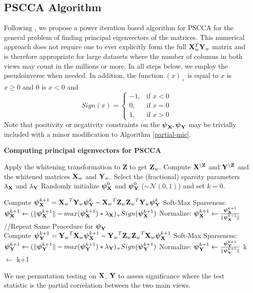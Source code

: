 \documentclass{llncs}
\newcommand{\X}{{\bf X}}
\newcommand{\Y}{{\bf Y}}
\newcommand{\Z}{{\bf Z}}
\newcommand{\bs}{\boldsymbol}
\begin{document}
\subsection{PSCCA Algorithm}
Following \cite{golub}, we propose a power iteration based algorithm
for PSCCA for the general problem of finding principal eigenvectors of
the matrices.  This numerical approach does not require one to ever
explicitly form the full $\X_{w}^T \Y_{w}$ matrix and is therefore
appropriate for large datasets where the number of columns in both views may
count in the millions or more.  In all steps below, we employ the
pseudoinverse when needed.  In addition, the function $(x)_+$ is equal to $x$ is $x \geq 0$ and $0$ is $x <0$ and 
 \begin{equation}
Sign(x)= \begin{cases} -1, & \mbox{if } x<0 \\0, & \mbox{if } x=0 \\1, & \mbox{if } x>0 \end{cases}
\end{equation}
Note that positivity or negativity constraints on the
$\bs\psi_{\X}, \bs\psi_{\Y}$ may be trivially included with a minor
modification to Algorithm \ref{partial-mic}.
\vspace{-0.1in}
\begin{algorithm}[htdp]
\small \caption{\bf Computing principal eigenvectors for PSCCA}
\label{partial-mic}
\begin{algorithmic}[1]
\STATE Apply the whitening transformation to {\Z} to get $\Z_{w}$.
\STATE Compute $\X^{\backslash \Z}$ and $\Y^{\backslash \Z}$ and the whitened matrices $\X_{w}$ and $\Y_{w}$. 
\STATE Select the (fractional) sparsity parameters $\lambda_{\X}$ and $\lambda_{\Y}$
\STATE Randomly initialize $\bs \psi_{\X}^0$ and $\bs \psi_{\Y}^0$ ($\sim \mathcal{N}(0,1)$) and set $k=0$.

\WHILE {$\Delta$ Corr($\bs X_w \bs \psi_{\X}^{k+1}$, $\bs Y_w \bs \psi_{\Y}^{k+1}$) $<$ $\epsilon$}
\STATE Compute  $\bs \psi_{\X}^{k+1}= {\X_w}^T {\Y_w} \bs \psi_{\Y}^{k} -  {\X_w}^T  {\Z_w} {\Z_w}^T {\Y_w} \bs \psi_{\Y}^{k}$
\STATE Soft-Max Sparseness:  $\bs \psi_{\X}^{k+1} \leftarrow (\|\bs \psi_{\X}^{k+1}\|  - max(\bs \psi_{\X}^{k+1})*\lambda_{\X})_+ Sign(\bs \psi_{\X}^{k+1})$
\STATE Normalize: $\bs \psi_{\X}^{k+1} \leftarrow \frac{\bs \psi_{\X}^{k+1}}{\|\bs \psi_{\X}^{k+1}\|}$\\
//Repeat Same Procedure for $\bs \psi_{\Y}$ \\
\STATE Compute  $\bs \psi_{\Y}^{k+1}= {\Y_w}^T {\X_w} \bs \psi_{\X}^{k+1} -  {\Y_w}^T  {\Z_w} {\Z_w}^T {\X_w} \bs \psi_{\X}^{k+1}$
\STATE Soft-Max Sparseness: $\bs \psi_{\Y}^{k+1} \leftarrow (\|\bs \psi_{\Y}^{k+1}\|  - max(\bs \psi_{\Y}^{k+1})*\lambda_{\Y})_+ Sign(\bs \psi_{\Y}^{k+1})$
\STATE Normalize: $\bs \psi_{\Y}^{k+1} \leftarrow \frac{\bs \psi_{\Y}^{k+1}}{\|\bs \psi_{\Y}^{k+1}\|}$
\STATE k $\leftarrow$ k+1
\ENDWHILE
\end{algorithmic}
\end{algorithm}
We use permutation testing on $\X$, $\Y$ to assess significance where
the test statistic is the partial correlation between the two main views.
\end{document}

